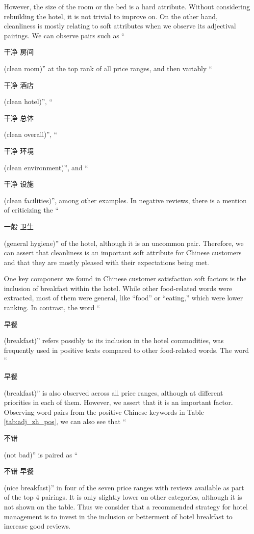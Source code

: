 \documentclass[smallextended,natbib]{svjour3}       %
\begin{document}
    However, the size of the room or the bed is a hard attribute. Without considering rebuilding the hotel, it is not trivial to improve on. On the other hand, cleanliness is mostly relating to soft attributes when we observe its adjectival pairings. We can observe pairs such as ``\begin{CJK}{UTF8}{gbsn}干净 房间\end{CJK} (clean room)'' at the top rank of all price ranges, and then variably ``\begin{CJK}{UTF8}{gbsn}干净 酒店\end{CJK} (clean hotel)'', ``\begin{CJK}{UTF8}{gbsn}干净 总体\end{CJK} (clean overall)'', ``\begin{CJK}{UTF8}{gbsn}干净 环境\end{CJK} (clean environment)'', and ``\begin{CJK}{UTF8}{gbsn}干净 设施\end{CJK} (clean facilities)'', among other examples. In negative reviews, there is a mention of criticizing the ``\begin{CJK}{UTF8}{gbsn}一般 卫生\end{CJK} (general hygiene)'' of the hotel, although it is an uncommon pair. Therefore, we can assert that cleanliness is an important soft attribute for Chinese customers and that they are mostly pleased with their expectations being met. 

    One key component we found in Chinese customer satisfaction soft factors is the inclusion of breakfast within the hotel. While other food-related words were extracted, most of them were general, like ``food'' or ``eating,'' which were lower ranking. In contrast, the word ``\begin{CJK}{UTF8}{gbsn}早餐\end{CJK} (breakfast)'' refers possibly to its inclusion in the hotel commodities, was frequently used in positive texts compared to other food-related words. The word ``\begin{CJK}{UTF8}{gbsn}早餐\end{CJK} (breakfast)'' is also observed across all price ranges, although at different priorities in each of them. However, we assert that it is an important factor. Observing word pairs from the positive Chinese keywords in Table \ref{tab:adj_zh_pos}, we can also see that ``\begin{CJK}{UTF8}{gbsn}不错\end{CJK} (not bad)'' is paired as ``\begin{CJK}{UTF8}{gbsn}不错 早餐\end{CJK} (nice breakfast)'' in four of the seven price ranges with reviews available as part of the top 4 pairings. It is only slightly lower on other categories, although it is not shown on the table. Thus we consider that a recommended strategy for hotel management is to invest in the inclusion or betterment of hotel breakfast to increase good reviews.
\end{document}
